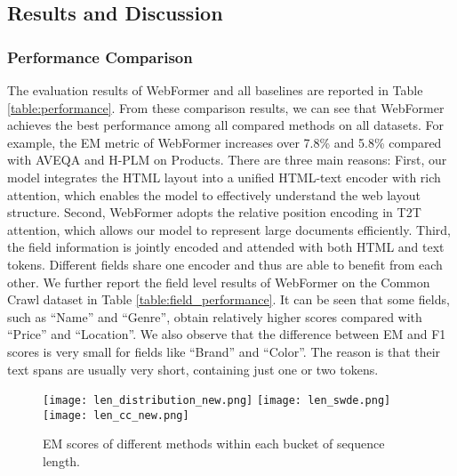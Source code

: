 \documentclass[sigconf]{acmart}
\begin{document}
\subsection{Results and Discussion}
\subsubsection{Performance Comparison}
The evaluation results of WebFormer and all baselines are reported in Table \ref{table:performance}. From these comparison results, we can see that WebFormer achieves the best performance among all compared methods on all datasets. For example, the EM metric of WebFormer increases over 7.8\% and 5.8\% compared with AVEQA and H-PLM on Products. There are three main reasons: First, our model integrates the HTML layout into a unified HTML-text encoder with rich attention, which enables the model to effectively understand the web layout structure. Second, WebFormer adopts the relative position encoding in T2T attention, which allows our model to represent large documents efficiently. Third, the field information is jointly encoded and attended with both HTML and text tokens. Different fields share one encoder and thus are able to benefit from each other.
We further report the field level results of WebFormer on the Common Crawl dataset in Table \ref{table:field_performance}. It can be seen that some fields, such as ``Name'' and ``Genre'', obtain relatively higher scores compared with ``Price'' and ``Location''. We also observe that the difference between EM and F1 scores is very small for fields like ``Brand'' and ``Color''. The reason is that their text spans are usually very short, containing just one or two tokens.
\begin{figure}
\centering
\texttt{[image: len\_distribution\_new.png]}
\texttt{[image: len\_swde.png]}
\texttt{[image: len\_cc\_new.png]}
\caption{EM scores of different methods within each bucket of sequence length.} \label{fig:len}
\end{figure}
\end{document}
